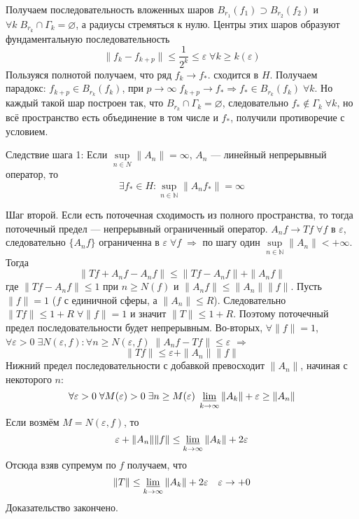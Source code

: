 \documentclass[12pt]{article}
\begin{document}
\begin{Proof}
    Получаем последовательность вложенных шаров $B_{r_1}(f_1) \supset B_{r_2}(f_2)$ и $\forall k\; B_{r_k} \cap \Gamma_k = \varnothing$, а радиусы стремяться к нулю.
    Центры этих шаров образуют фундаментальную последовательность
    $$
    \|f_k - f_{k + p}\| \le \frac{1}{2^k} \le \varepsilon\; \forall k \ge k(\varepsilon)
    $$
    Пользуяся полнотой получаем, что ряд $f_k \to f_*$. сходится в $H$.
    Получаем парадокс: $f_{k+p} \in B_{r_k}(f_k)$, при $p \to \infty\; f_{k+p} \to f_* \Rightarrow  f_* \in B_{r_k}(f_k)\; \forall k$.
    Но каждый такой шар построен так, что $B_{r_k} \cap \Gamma_k = \varnothing$, следовательно $f_* \notin \Gamma_k\; \forall k$, но всё пространство есть объединение
    в том числе и $f_*$, получили противоречие с условием.

    Следствие шага 1: Если $\sup\limits_{n \in N}\|A_n\| = \infty$, $A_n$ --- линейный непрерывный оператор, то 
    $$\exists f_* \in H\colon
    \sup \limits_{n \in \mathbb N}\|A_n f_*\| = \infty
    $$

    Шаг второй. Если есть поточечная сходимость из полного пространства, то тогда поточечный предел --- непрерывный ограниченный оператор.
    $A_n f \to T f\; \forall f$ в $\varepsilon$, следовательно $\{A_n f\}$ ограниченна в $\varepsilon\; \forall f\; \Rightarrow$ по шагу один $\sup \limits_{n \in
    \mathbb N}\|A_n\| < +\infty$.
    Тогда 
    $$
    \|Tf + A_n f - A_n f\| \le \|Tf - A_n f\| + \|A_n f\|
    $$
     где $\|Tf - A_n f\| \le 1$ при $n \ge N(f)$ и $\|A_n f\| \le \|A_n\| \|f\|$. 
     Пусть $\|f\| = 1$ ($f$ с
    единичной сферы, а $\|A_n\| \le R$).
    Следовательно $\|Tf\| \le 1 + R\; \forall \|f\| = 1$ и значит $\|T\| \le 1 + R$.
    Поэтому поточечный предел последовательности будет непрерывным.
    Во-вторых, $\forall \|f\| = 1$, $\forall \varepsilon > 0\; \exists N(\varepsilon, f)\colon \forall n \ge N(\varepsilon, f)\; \|A_n f - Tf\| \le \varepsilon$
    $\Rightarrow$
    $$
    \|Tf\| \le \varepsilon + \|A_n\|\|f\|
    $$
    Нижний предел последовательности с добавкой превосходит $\|A_n\|$, начиная с некоторого $n$:
    $$
    \forall \varepsilon > 0\; \forall M(\varepsilon) > 0\; \exists n \ge M(\varepsilon)\; \varliminf\limits_{k \to \infty}\|A_k\| + \varepsilon \ge \|A_n\|
    $$
    Если возмём $M = N(\varepsilon, f)$, то 
    $$
    \varepsilon + \|A_n\| \|f\| \le \varliminf\limits_{k \to \infty}\|A_k\| + 2 \varepsilon
    $$
    Отсюда взяв супремум по $f$ получаем, что 
    $$
    \|T\| \le \varliminf\limits_{k \to \infty}\|A_k\| + 2 \varepsilon\quad \varepsilon \to +0
    $$
    Доказательство закончено.
\end{Proof}
\end{document}
